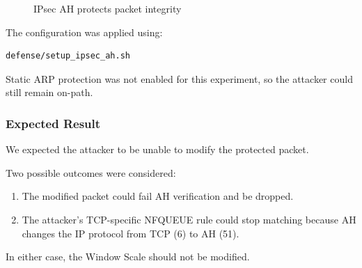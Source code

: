 \documentclass[11pt]{article}
\begin{document}
\begin{figure}[h]
\centering
{}
\caption{IPsec AH protects packet integrity}
\end{figure}

The configuration was applied using:

\begin{lstlisting}
defense/setup_ipsec_ah.sh
\end{lstlisting}

Static ARP protection was not enabled for this experiment, so the
attacker could still remain on-path.

\subsubsection*{Expected Result}

We expected the attacker to be unable to modify the protected packet.

Two possible outcomes were considered:

\begin{enumerate}
    \item The modified packet could fail AH verification and be dropped.
    \item The attacker's TCP-specific NFQUEUE rule could stop matching
    because AH changes the IP protocol from TCP (6) to AH (51).
\end{enumerate}

In either case, the Window Scale should not be modified.
\end{document}
